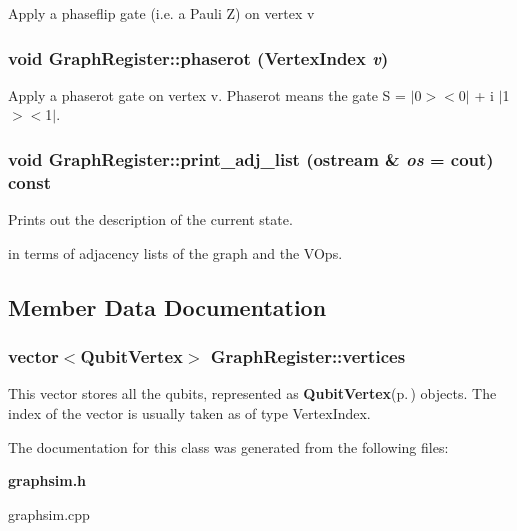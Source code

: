 Apply a phaseflip gate (i.e. a Pauli Z) on vertex v 
\subsubsection{\setlength{\rightskip}{0pt plus 5cm}void Graph\-Register::phaserot ({\bf Vertex\-Index} {\em v})\hspace{0.3cm}{\tt  [inline]}}\label{classGraphRegister_a5}


Apply a phaserot gate on vertex v. Phaserot means the gate S = $|$0$>$$<$0$|$ + i $|$1$>$$<$1$|$. 
\subsubsection{\setlength{\rightskip}{0pt plus 5cm}void Graph\-Register::print\_\-adj\_\-list (ostream \& {\em os} = cout) const}\label{classGraphRegister_a13}


Prints out the description of the current state. 

in terms of adjacency lists of the graph and the VOps. 

\subsection{Member Data Documentation}
\subsubsection{\setlength{\rightskip}{0pt plus 5cm}vector$<${\bf Qubit\-Vertex}$>$ {\bf Graph\-Register::vertices}}\label{classGraphRegister_o0}


This vector stores all the qubits, represented as {\bf Qubit\-Vertex}{\rm (p.\,\pageref{structQubitVertex})} objects. The index of the vector is usually taken as of type Vertex\-Index. 

The documentation for this class was generated from the following files:\begin{CompactItemize}
\item 
{\bf graphsim.h}\item 
graphsim.cpp\end{CompactItemize}
